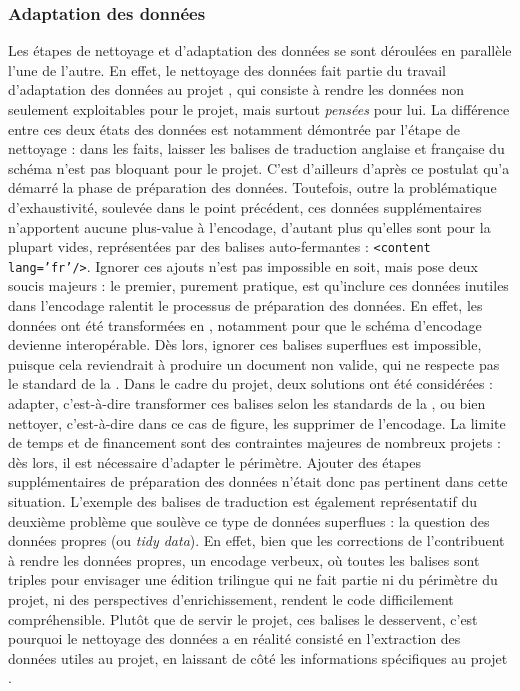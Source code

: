 \subsubsection{Adaptation des données}
Les étapes de nettoyage et d'adaptation des données se sont déroulées en parallèle l'une de l'autre. En effet, le nettoyage des données fait partie du travail d'adaptation des données au projet \COREL, qui consiste à rendre les données non seulement exploitables pour le projet, mais surtout \textit{pensées} pour lui. La différence entre ces deux états des données est notamment démontrée par l'étape de nettoyage : dans les faits, laisser les balises de traduction anglaise et française du schéma \LSC n'est pas bloquant pour le projet. C'est d'ailleurs d'après ce postulat qu'a démarré la phase de préparation des données. Toutefois, outre la problématique d'exhaustivité, soulevée dans le point précédent, ces données supplémentaires n'apportent aucune plus-value à l'encodage, d'autant plus qu'elles sont pour la plupart vides, représentées par des balises auto-fermantes : \texttt{<content lang='fr'/>}. Ignorer ces ajouts n'est pas impossible en soit, mais pose deux soucis majeurs : le premier, purement pratique, est qu'inclure ces données inutiles dans l'encodage \XML ralentit le processus de préparation des données. En effet, les données \XML ont été transformées en \TEI, notamment pour que le schéma d'encodage devienne interopérable. Dès lors, ignorer ces balises superflues est impossible, puisque cela reviendrait à produire un document non valide, qui ne respecte pas le standard de la \TEI. Dans le cadre du projet, deux solutions ont été considérées : adapter, c'est-à-dire transformer ces balises selon les standards de la \TEI, ou bien nettoyer, c'est-à-dire dans ce cas de figure, les supprimer de l'encodage. La limite de temps et de financement sont des contraintes majeures de nombreux projets : dès lors, il est nécessaire d'adapter le périmètre. Ajouter des étapes supplémentaires de préparation des données n'était donc pas pertinent dans cette situation. L'exemple des balises de traduction est également représentatif du deuxième problème que soulève ce type de données superflues : la question des données propres (ou \textit{tidy data}). En effet, bien que les corrections de l'\OCR contribuent à rendre les données propres, un encodage verbeux, où toutes les balises sont triples pour envisager une édition trilingue qui ne fait partie ni du périmètre du projet, ni des perspectives d'enrichissement, rendent le code difficilement compréhensible. Plutôt que de servir le projet, ces balises le desservent, c'est pourquoi le nettoyage des données a en réalité consisté en l'extraction des données utiles au projet, en laissant de côté les informations spécifiques au projet \LSC.  


